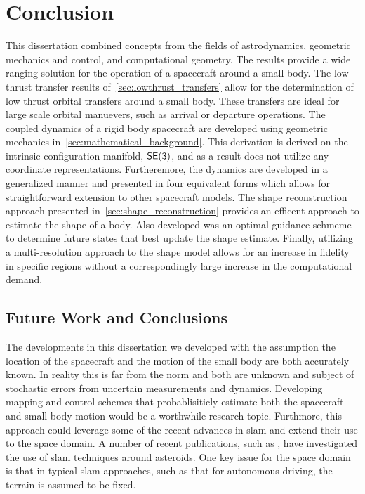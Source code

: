 
\chapter{Conclusion}\label{sec:conclusion}

This dissertation combined concepts from the fields of astrodynamics, geometric mechanics and control, and computational geometry.
The results provide a wide ranging solution for the operation of a spacecraft around a small body.
The low thrust transfer results of~\cref{sec:lowthrust_transfers} allow for the determination of low thrust orbital transfers around a small body. 
These transfers are ideal for large scale orbital manuevers, such as arrival or departure operations.
The coupled dynamics of a rigid body spacecraft are developed using geometric mechanics in~\cref{sec:mathematical_background}.
This derivation is derived on the intrinsic configuration manifold, \( \mathsf{SE(3)} \), and as a result does not utilize any coordinate representations.
Furtheremore, the dynamics are developed in a generalized manner and presented in four equivalent forms which allows for straightforward extension to other spacecraft models.
The shape reconstruction approach presented in~\cref{sec:shape_reconstruction} provides an efficent approach to estimate the shape of a body. 
Also developed was an optimal guidance schmeme to determine future states that best update the shape estimate. 
Finally, utilizing a multi-resolution approach to the shape model allows for an increase in fidelity in specific regions without a correspondingly large increase in the computational demand.

\section{Future Work and Conclusions}

The developments in this dissertation we developed with the assumption the location of the spacecraft and the motion of the small body are both accurately known.
In reality this is far from the norm and both are unknown and subject of stochastic errors from uncertain measurements and dynamics. 
Developing mapping and control schemes that probablisiticly estimate both the spacecraft and small body motion would be a worthwhile research topic.
Furthmore, this approach could leverage some of the recent advances in \gls{slam} and extend their use to the space domain.
A number of recent publications, such as \textcite{cocaud2010,cocaud2012,vassallo2015,kulumani2017b}, have investigated the use of \gls{slam} techniques around asteroids.
One key issue for the space domain is that in typical \gls{slam} approaches, such as that for autonomous driving, the terrain is assumed to be fixed.

